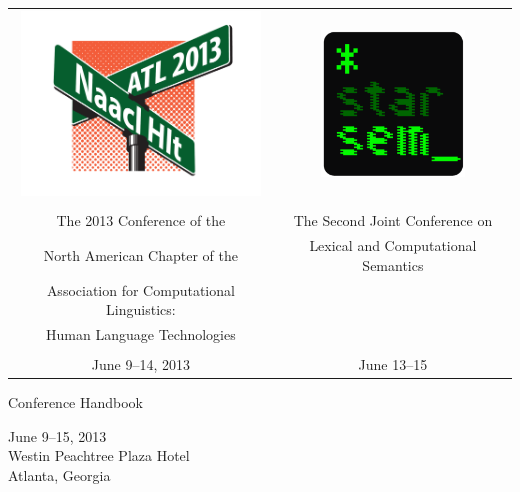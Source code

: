 \thispagestyle{empty}

\mbox{}\vfill

\begin{center}
  \begin{tabular}{cc}
    \includegraphics[width=2.5in]{content/fmatter/NAACL2013.pdf}
    & \includegraphics[width=1.5in]{content/fmatter/STARSEM.pdf} \\
    \vspace{0.5in} \\
    The 2013 Conference of the                     & The Second Joint Conference on \\
    North American Chapter of the                  & Lexical and Computational Semantics \\
    Association for Computational Linguistics: \\  
    Human Language Technologies                 \\
    \\
    June 9--14, 2013  & June 13--15 \\
  \end{tabular}

  \vspace{0.5in}
  {\huge Conference Handbook}\vspace{3em}

  {\large June 9--15, 2013 \\
    Westin Peachtree Plaza Hotel \\
    Atlanta, Georgia}
  \vspace{2em}

  \vfill

\end{center}
\newpage
